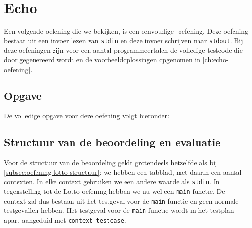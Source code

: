 \inputminted[firstline=6,lastline=50,gobble=8]{json}{sources/lotto-plan.tson}

\section{Echo}\label{sec:oefening-echo}

Een volgende oefening die we bekijken, is een eenvoudige -oefening.
Deze oefening bestaat uit een invoer lezen van \texttt{stdin} en deze invoer schrijven naar \texttt{stdout}.
Bij deze oefeningen zijn voor een aantal programmeertalen de volledige testcode die door \tested{} gegenereerd wordt en de voorbeeldoplossingen opgenomen in \cref{ch:echo-oefening}.

\subsection{Opgave}\label{subsec:oefening-echo-opgave}

De volledige opgave voor deze oefening volgt hieronder:

\begin{quote}
\end{quote}

\subsection{Structuur van de beoordeling en evaluatie}\label{subsec:oefening-echo-structuur}

Voor de structuur van de beoordeling geldt grotendeels hetzelfde als bij \cref{subsec:oefening-lotto-structuur}: we hebben een tabblad, met daarin een aantal contexten.
In elke context gebruiken we een andere waarde als \texttt{stdin}.
In tegenstelling tot de Lotto-oefening hebben we nu wel een \texttt{main}-functie.
De context zal dus bestaan uit het testgeval voor de \texttt{main}-functie en geen normale testgevallen hebben.
Het testgeval voor de \texttt{main}-functie wordt in het testplan apart aangeduid met \texttt{context\_testcase}.

